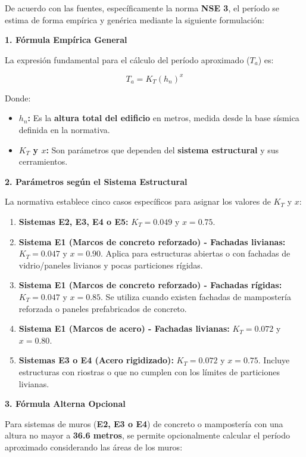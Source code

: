 \documentclass[14pt,letterpaper]{extarticle}
\begin{document}
De acuerdo con las fuentes, específicamente la norma \textbf{NSE 3}, el período se estima de forma empírica y genérica mediante la siguiente formulación:

\textbf{1. Fórmula Empírica General}

La expresión fundamental para el cálculo del período aproximado ($T_a$) es:

\[
T_a = K_T (h_n)^x
\]

Donde:

\begin{itemize}
	\item \textbf{$h_n$:} Es la \textbf{altura total del edificio} en metros, medida desde la base sísmica definida en la normativa.
	\item \textbf{$K_T$ y $x$:} Son parámetros que dependen del \textbf{sistema estructural} y sus cerramientos.
\end{itemize}

\textbf{2. Parámetros según el Sistema Estructural}

La normativa establece cinco casos específicos para asignar los valores de $K_T$ y $x$:

\begin{enumerate}
	\item \textbf{Sistemas E2, E3, E4 o E5:} $K_T = 0.049$ y $x = 0.75$.
	\item \textbf{Sistema E1 (Marcos de concreto reforzado) - Fachadas livianas:} $K_T = 0.047$ y $x = 0.90$. Aplica para estructuras abiertas o con fachadas de vidrio/paneles livianos y pocas particiones rígidas.
	\item \textbf{Sistema E1 (Marcos de concreto reforzado) - Fachadas rígidas:} $K_T = 0.047$ y $x = 0.85$. Se utiliza cuando existen fachadas de mampostería reforzada o paneles prefabricados de concreto.
	\item \textbf{Sistema E1 (Marcos de acero) - Fachadas livianas:} $K_T = 0.072$ y $x = 0.80$.
	\item \textbf{Sistemas E3 o E4 (Acero rigidizado):} $K_T = 0.072$ y $x = 0.75$. Incluye estructuras con riostras o que no cumplen con los límites de particiones livianas.
\end{enumerate}

\textbf{3. Fórmula Alterna Opcional}

Para sistemas de muros (\textbf{E2, E3 o E4}) de concreto o mampostería con una altura no mayor a \textbf{36.6 metros}, se permite opcionalmente calcular el período aproximado considerando las áreas de los muros:
\end{document}
